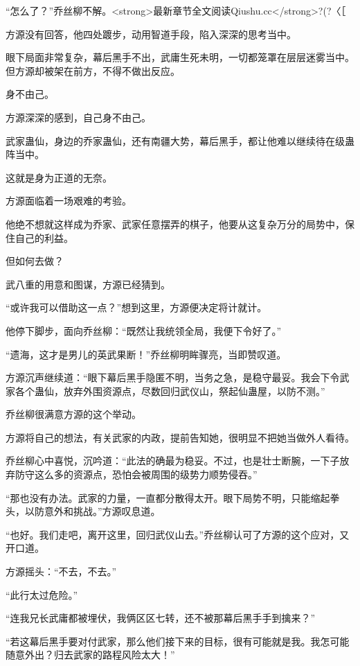 
\begin{this_body}

“怎么了？”乔丝柳不解。<strong>最新章节全文阅读Qiushu.cc</strong>?(?〈［

方源没有回答，他四处踱步，动用智道手段，陷入深深的思考当中。

眼下局面非常复杂，幕后黑手不出，武庸生死未明，一切都笼罩在层层迷雾当中。但方源却被架在前方，不得不做出反应。

身不由己。

方源深深的感到，自己身不由己。

武家蛊仙，身边的乔家蛊仙，还有南疆大势，幕后黑手，都让他难以继续待在级蛊阵当中。

这就是身为正道的无奈。

方源面临着一场艰难的考验。

他绝不想就这样成为乔家、武家任意摆弄的棋子，他要从这复杂万分的局势中，保住自己的利益。

但如何去做？

武八重的用意和图谋，方源已经猜到。

“或许我可以借助这一点？”想到这里，方源便决定将计就计。

他停下脚步，面向乔丝柳：“既然让我统领全局，我便下令好了。”

“遗海，这才是男儿的英武果断！”乔丝柳明眸骤亮，当即赞叹道。

方源沉声继续道：“眼下幕后黑手隐匿不明，当务之急，是稳守最妥。我会下令武家各个蛊仙，放弃外围资源点，尽数回归武仪山，祭起仙蛊屋，以防不测。”

乔丝柳很满意方源的这个举动。

方源将自己的想法，有关武家的内政，提前告知她，很明显不把她当做外人看待。

乔丝柳心中喜悦，沉吟道：“此法的确最为稳妥。不过，也是壮士断腕，一下子放弃防守这么多的资源点，恐怕会被周围的级势力顺势侵吞。”

“那也没有办法。武家的力量，一直都分散得太开。眼下局势不明，只能缩起拳头，以防意外和挑战。”方源叹息道。

“也好。我们走吧，离开这里，回归武仪山去。”乔丝柳认可了方源的这个应对，又开口道。

方源摇头：“不去，不去。”

“此行太过危险。”

“连我兄长武庸都被埋伏，我俩区区七转，还不被那幕后黑手手到擒来？”

“若这幕后黑手要对付武家，那么他们接下来的目标，很有可能就是我。我怎可能随意外出？归去武家的路程风险太大！”


\end{this_body}
